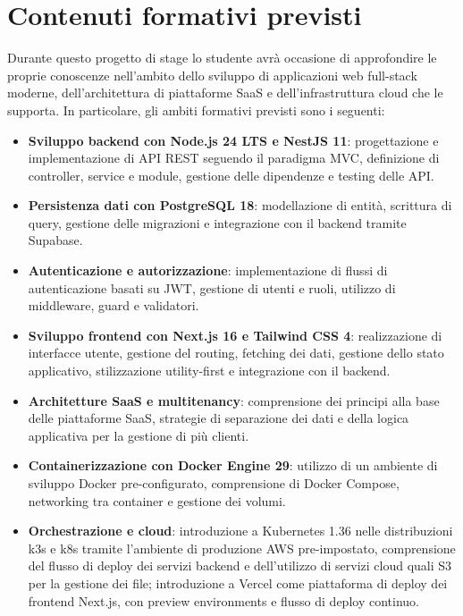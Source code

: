 \section*{Contenuti formativi previsti}
Durante questo progetto di stage lo studente avrà occasione di approfondire le proprie conoscenze nell'ambito dello sviluppo di applicazioni web full-stack moderne, dell'architettura di piattaforme SaaS e dell'infrastruttura cloud che le supporta. In particolare, gli ambiti formativi previsti sono i seguenti:

\begin{itemize}
    \item \textbf{Sviluppo backend con Node.js 24 LTS e NestJS 11}: progettazione e implementazione di API REST seguendo il paradigma MVC, definizione di controller, service e module, gestione delle dipendenze e testing delle API.

    \item \textbf{Persistenza dati con PostgreSQL 18}: modellazione di entità, scrittura di query, gestione delle migrazioni e integrazione con il backend tramite Supabase.

    \item \textbf{Autenticazione e autorizzazione}: implementazione di flussi di autenticazione basati su JWT, gestione di utenti e ruoli, utilizzo di middleware, guard e validatori.

    \item \textbf{Sviluppo frontend con Next.js 16 e Tailwind CSS 4}: realizzazione di interfacce utente, gestione del routing, fetching dei dati, gestione dello stato applicativo, stilizzazione utility-first e integrazione con il backend.

    \item \textbf{Architetture SaaS e multitenancy}: comprensione dei principi alla base delle piattaforme SaaS, strategie di separazione dei dati e della logica applicativa per la gestione di più clienti.

    \item \textbf{Containerizzazione con Docker Engine 29}: utilizzo di un ambiente di sviluppo Docker pre-configurato, comprensione di Docker Compose, networking tra container e gestione dei volumi.

    \item \textbf{Orchestrazione e cloud}: introduzione a Kubernetes 1.36 nelle distribuzioni k3s e k8s tramite l'ambiente di produzione AWS pre-impostato, comprensione del flusso di deploy dei servizi backend e dell'utilizzo di servizi cloud quali S3 per la gestione dei file; introduzione a Vercel come piattaforma di deploy dei frontend Next.js, con preview environments e flusso di deploy continuo.


\end{itemize}
